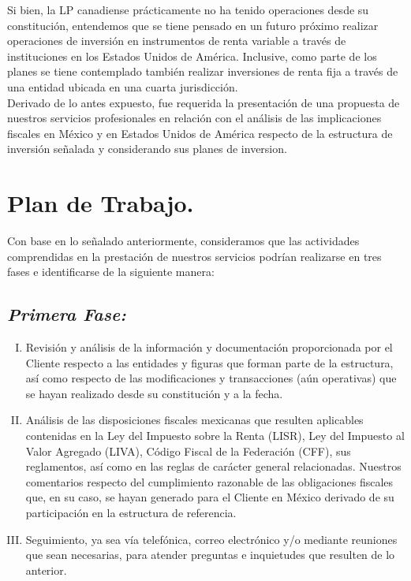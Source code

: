 \documentclass[5pt,letter]{report}
\begin{document}
Si bien, la LP canadiense prácticamente no ha tenido operaciones desde su constitución, 
entendemos que se tiene pensado en un futuro próximo realizar operaciones de inversión en 
instrumentos de renta variable a través de instituciones en los Estados Unidos de América. 
Inclusive, como parte de los planes se tiene contemplado también realizar inversiones de renta 
fija a través de una entidad ubicada en una cuarta jurisdicción.  \\ 

Derivado de lo antes expuesto, fue requerida la presentación de una propuesta de nuestros 
servicios profesionales en relación con el análisis de las implicaciones fiscales en México y en 
Estados Unidos de América respecto de la estructura de inversión señalada y considerando sus 
planes de inversion.

\section*{Plan de Trabajo.} %

Con base en lo señalado anteriormente, consideramos que las actividades comprendidas en la 
prestación de nuestros servicios podrían realizarse en tres fases e identificarse de la siguiente 
manera:

\subsection*{\it Primera Fase:} %
\begin{enumerate}[I.]
\item 
Revisión y análisis de la información y documentación proporcionada por el Cliente 
respecto a las entidades y figuras que forman parte de la estructura, así como respecto 
de las modificaciones y transacciones (aún operativas) que se hayan realizado desde su 
constitución y a la fecha. 
\item 
Análisis de las disposiciones fiscales mexicanas que resulten aplicables contenidas en la 
Ley del Impuesto sobre la Renta (LISR), Ley del Impuesto al Valor Agregado (LIVA), 
Código Fiscal de la Federación (CFF), sus reglamentos, así como en las reglas de carácter 
general relacionadas. 
Nuestros comentarios respecto del cumplimiento razonable de las obligaciones fiscales 
que, en su caso, se hayan generado para el Cliente en México derivado de su 
participación en la estructura de referencia. 
\item 
Seguimiento, ya sea vía telefónica, correo electrónico y/o mediante reuniones que sean 
necesarias, para atender preguntas e inquietudes que resulten de lo anterior.
\end{enumerate}
\end{document}
